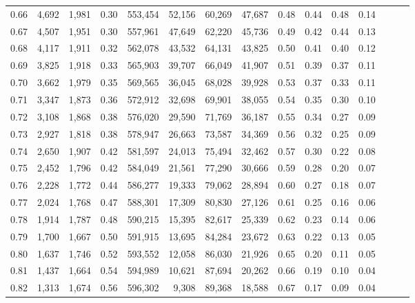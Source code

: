 \begin{tabular}{rrrrrrrrrrrrrrr}
0.66 &   4,692 &  1,981 &  0.30 &  553,454 &   52,156 &   60,269 &   47,687 &  0.48 &  0.44 &  0.48 &      0.14 \\
0.67 &   4,507 &  1,951 &  0.30 &  557,961 &   47,649 &   62,220 &   45,736 &  0.49 &  0.42 &  0.44 &      0.13 \\
0.68 &   4,117 &  1,911 &  0.32 &  562,078 &   43,532 &   64,131 &   43,825 &  0.50 &  0.41 &  0.40 &      0.12 \\
0.69 &   3,825 &  1,918 &  0.33 &  565,903 &   39,707 &   66,049 &   41,907 &  0.51 &  0.39 &  0.37 &      0.11 \\
0.70 &   3,662 &  1,979 &  0.35 &  569,565 &   36,045 &   68,028 &   39,928 &  0.53 &  0.37 &  0.33 &      0.11 \\
0.71 &   3,347 &  1,873 &  0.36 &  572,912 &   32,698 &   69,901 &   38,055 &  0.54 &  0.35 &  0.30 &      0.10 \\
0.72 &   3,108 &  1,868 &  0.38 &  576,020 &   29,590 &   71,769 &   36,187 &  0.55 &  0.34 &  0.27 &      0.09 \\
0.73 &   2,927 &  1,818 &  0.38 &  578,947 &   26,663 &   73,587 &   34,369 &  0.56 &  0.32 &  0.25 &      0.09 \\
0.74 &   2,650 &  1,907 &  0.42 &  581,597 &   24,013 &   75,494 &   32,462 &  0.57 &  0.30 &  0.22 &      0.08 \\
0.75 &   2,452 &  1,796 &  0.42 &  584,049 &   21,561 &   77,290 &   30,666 &  0.59 &  0.28 &  0.20 &      0.07 \\
0.76 &   2,228 &  1,772 &  0.44 &  586,277 &   19,333 &   79,062 &   28,894 &  0.60 &  0.27 &  0.18 &      0.07 \\
0.77 &   2,024 &  1,768 &  0.47 &  588,301 &   17,309 &   80,830 &   27,126 &  0.61 &  0.25 &  0.16 &      0.06 \\
0.78 &   1,914 &  1,787 &  0.48 &  590,215 &   15,395 &   82,617 &   25,339 &  0.62 &  0.23 &  0.14 &      0.06 \\
0.79 &   1,700 &  1,667 &  0.50 &  591,915 &   13,695 &   84,284 &   23,672 &  0.63 &  0.22 &  0.13 &      0.05 \\
0.80 &   1,637 &  1,746 &  0.52 &  593,552 &   12,058 &   86,030 &   21,926 &  0.65 &  0.20 &  0.11 &      0.05 \\
0.81 &   1,437 &  1,664 &  0.54 &  594,989 &   10,621 &   87,694 &   20,262 &  0.66 &  0.19 &  0.10 &      0.04 \\
0.82 &   1,313 &  1,674 &  0.56 &  596,302 &    9,308 &   89,368 &   18,588 &  0.67 &  0.17 &  0.09 &      0.04 \\

\end{tabular}
